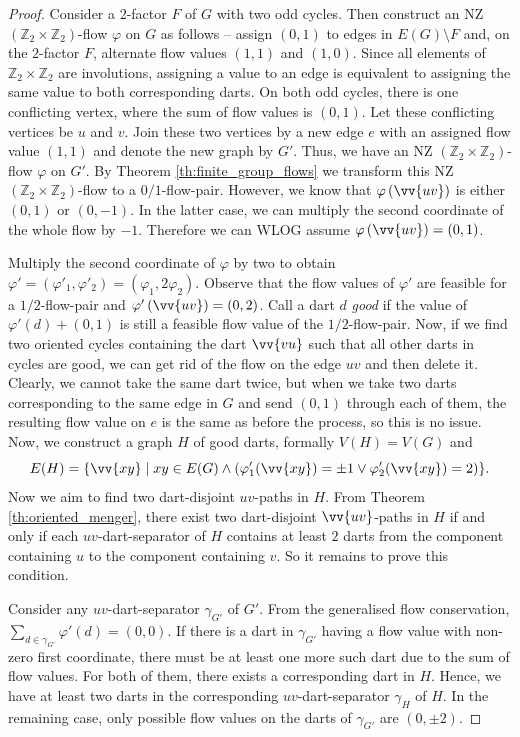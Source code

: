 \begin{proof}
Consider a $2$-factor $F$ of $G$ with two odd cycles. Then construct an NZ $(\mathbb Z_2\times \mathbb Z_2)$-flow $\varphi$ on $G$ as follows – assign $(0,1)$ to edges in $E(G)\setminus F$ and, on the $2$-factor $F$, alternate flow values $(1,1)$ and $(1,0)$. Since all elements of $\mathbb Z_2\times \mathbb Z_2$ are involutions, assigning a value to an edge is equivalent to assigning the same value to both corresponding darts. On both odd cycles, there is one conflicting vertex, where the sum of flow values is $(0,1)$. Let these conflicting vertices be $u$ and $v$. Join these two vertices by a new edge $e$ with an assigned flow value $(1,1)$ and denote the new graph by $G'$. Thus, we have an NZ $(\mathbb Z_2\times \mathbb Z_2)$-flow $\varphi$ on $G'$. By Theorem \ref{th:finite_group_flows} we transform this NZ $(\mathbb Z_2\times\mathbb Z_2)$-flow to a $0/1$-flow-pair. However, we know that $\varphi\left(\vv{uv}\right)$ is either $(0, 1)$ or $(0, -1)$. In the latter case, we can multiply the second coordinate of the whole flow by $-1$. Therefore we can WLOG assume $\varphi\left(\vv{uv}\right)=(0,1)$.

Multiply the second coordinate of $\varphi$ by two to obtain $\varphi'=(\varphi'_1,\varphi'_2)=(\varphi_1, 2\varphi_2)$. Observe that the flow values of $\varphi'$ are feasible for a $1/2$-flow-pair and $\varphi'\left(\vv{uv}\right)=(0,2)$. Call a dart $d$ \emph{good} if the value of $\varphi'\left(d\right) + (0,1)$ is still a feasible flow value of the $1/2$-flow-pair. Now, if we find two oriented cycles containing the dart $\vv{vu}$ such that all other darts in cycles are good, we can get rid of the flow on the edge $uv$ and then delete it. Clearly, we cannot take the same dart twice, but when we take two darts corresponding to the same edge in $G$ and send $(0,1)$ through each of them, the resulting flow value on $e$ is the same as before the process, so this is no issue. Now, we construct a graph $H$ of good darts, formally $V(H)=V(G)$ and
$$E(H)=\{\vv{xy}\mid xy\in E(G) \land (\varphi_1'(\vv{xy})=\pm 1 \lor \varphi_2'(\vv{xy})=2)\}.$$
Now we aim to find two dart-disjoint $uv$-paths in $H$. From Theorem \ref{th:oriented_menger}, there exist two dart-disjoint $\vv{uv}$-paths in $H$ if and only if each $uv$-dart-separator of $H$ contains at least $2$ darts from the component containing $u$ to the component containing $v$. So it remains to prove this condition.

Consider any $uv$-dart-separator $\gamma_{G'}$ of $G'$. From the generalised flow conservation, $\sum_{d\in\gamma_{G'}} \varphi'\left(d\right)=(0,0)$. If there is a dart in $\gamma_{G'}$ having a flow value with non-zero first coordinate, there must be at least one more such dart due to the sum of flow values. For both of them, there exists a corresponding dart in $H$. Hence, we have at least two darts in the corresponding $uv$-dart-separator $\gamma_H$ of $H$. In the remaining case, only possible flow values on the darts of $\gamma_{G'}$ are $(0,\pm 2)$.


\end{proof}
